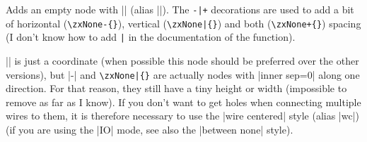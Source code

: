 \documentclass[a4paper]{ltxdoc}
\begin{document}
{\begin{pgfmanualentry}
  \extractcommand\zxNone\opt{+}\opt{-}\@@
  \extractcommand\zxN\opt{+}\opt{-}\@@
  \pgfmanualbody
  Adds an empty node with |\zxNone{}| (alias |\zxN{}|). The \verb#-|+# decorations are used to add a bit of horizontal (\verb#\zxNone-{}#), vertical (\verb#\zxNone|{}#) and both (\verb#\zxNone+{}#) spacing (I don't know how to add \verb#|# in the documentation of the function).

  |\zxNone| is just a coordinate (when possible this node should be preferred over the other versions), but |\zxNone-{}| and \verb#\zxNone|{}# are actually nodes with |inner sep=0| along one direction. For that reason, they still have a tiny height or width (impossible to remove as far as I know). If you don't want to get holes when connecting multiple wires to them, it is therefore necessary to use the |wire centered| style (alias |wc|) (if you are using the |IO| mode, see also the |between none| style).


\end{pgfmanualentry}}
\end{document}
